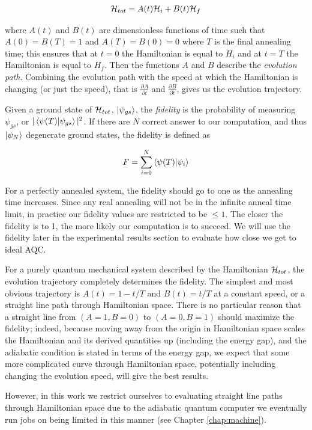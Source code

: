 \begin{equation}
	\mathcal{H}_{tot} = A(t)\mathcal{H}_i + B(t)\mathcal{H}_f
\end{equation}

where $A(t)$ and $B(t)$ are dimensionless functions of time such that $A(0) = B(T) = 1$ and $A(T) = B(0) = 0$ where $T$ is the final annealing time; this ensures that at $t = 0$ the Hamiltonian is equal to $H_i$ and at $t = T$ the Hamiltonian is equal to $H_f$.  Then the functions $A$ and $B$ describe the \emph{evolution path}.  Combining the evolution path with the speed at which the Hamiltonian is changing (or just the speed), that is $\frac{\partial A}{\partial t}$ and $\frac{\partial B}{\partial t}$, gives us the evolution trajectory.  

Given a ground state of $\mathcal{H}_{tot}$, $\mathinner{|{\psi_{gs}}\rangle}$, the \emph{fidelity} is the probability of measuring $\psi_{gs}$, or $|\mathinner{\langle{\psi(T)|\psi_{gs}}\rangle}|^2$.  If there are $N$ correct answer to our computation, and thus $\mathinner{|{\psi_N}\rangle}$ degenerate ground states, the fidelity is defined as

\begin{equation}
	F = \sum_{i=0}^N \mathinner{\langle{\psi(T)|\psi_i}\rangle}
\end{equation}

For a perfectly annealed system, the fidelity should go to one as the annealing time increases.  Since any real annealing will not be in the infinite anneal time limit, in practice our fidelity values are restricted to be $\leq 1$.  The closer the fidelity is to 1, the more likely our computation is to succeed.  We will use the fidelity later in the experimental results section to evaluate how close we get to ideal AQC.

For a purely quantum mechanical system described by the Hamiltonian $\mathcal{H}_{tot}$, the evolution trajectory completely determines the fidelity.
The simplest and most obvious trajectory is $A(t) = 1 - t/T$ and $B(t) = t/T$ at a constant speed, or a straight line path through Hamiltonian space.
There is no particular reason that a straight line from $(A=1,B=0)$ to $(A=0,B=1)$ should maximize the fidelity; indeed, because moving away from the origin in Hamiltonian space scales the Hamiltonian and its derived quantities up (including the energy gap), and the adiabatic condition is stated in terms of the energy gap, we expect that some more complicated curve through Hamiltonian space, potentially including changing the evolution speed, will give the best results.

However, in this work we restrict ourselves to evaluating straight line paths through Hamiltonian space due to the adiabatic quantum computer we eventually run jobs on being limited in this manner (see Chapter \ref{chap:machine}).


